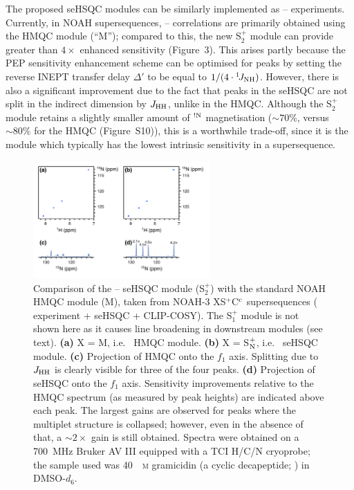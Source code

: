 \documentclass[final,twocolumn]{elsarticle}
\newcommand*{\noahCc}{C$\rm ^c$}
\newcommand*{\noahM}{M}
\newcommand*{\noahSp}{S$^+$}
\newcommand*{\noahSpa}{S$^+_1$}
\newcommand*{\noahSpb}{S$^+_2$}
\newcommand*{\noahSpn}{S$\rm ^+_N$}
\newcommand*{\noahX}{X}
\newcommand*{\carbon}{\ce{^{13}C}}
\newcommand*{\proton}{\ce{^{1}H}}
\newcommand*{\nitrogen}{\ce{^{15}N}}
\newcommand*{\onejnh}{{}^{1}\!J_{\ce{NH}}}
\newcommand*{\jhh}{J_{\ce{HH}}}
\newcommand*{\magnnot}[1]{\ce{^1H}$^{!#1}$}
\begin{document}
The proposed seHSQC modules can be similarly implemented as \proton{}--\nitrogen{} experiments.
Currently, in NOAH supersequences, \proton{}--\nitrogen{} correlations are primarily obtained using the HMQC module (``M'');\cite{Kupce2007MRC, Kupce2017ACIE} compared to this, the new \noahSpb{} module can provide greater than $4\times$ enhanced sensitivity (Figure~3).
This arises partly because the PEP sensitivity enhancement scheme can be optimised for  peaks by setting the reverse INEPT transfer delay $\Delta'$ to be equal to $1/(4 \cdot\onejnh)$.
However, there is also a significant improvement due to the fact that peaks in the \nitrogen{} seHSQC are not split in the indirect dimension by $\jhh$, unlike in the HMQC.
Although the \noahSpb{} module retains a slightly smaller amount of \magnnot{\ce{N}} magnetisation ($\sim 70\%$, versus $\sim 80\%$ for the HMQC (Figure~S10)), this is a worthwhile trade-off, since it is the \nitrogen{} module which typically has the lowest intrinsic sensitivity in a supersequence.

\begin{figure}[!ht]
    \centering
    \includegraphics[width=0.6\textwidth]{FIG3.png}
    \caption{
        Comparison of the \proton{}--\nitrogen{} seHSQC module (\noahSpb{}) with the standard NOAH HMQC module (\noahM{}), taken from NOAH-3 \noahX{}\noahSp{}\noahCc{} supersequences (\nitrogen{} experiment + \carbon{} seHSQC + CLIP-COSY).
        The \noahSpa{} module is not shown here as it causes line broadening in downstream modules (see text).
        \textbf{(a)} X = \noahM{}, i.e.\ \nitrogen{} HMQC module.
        \textbf{(b)} X = \noahSpn{}, i.e.\ \nitrogen{} seHSQC module.
        \textbf{(c)} Projection of HMQC onto the $f_1$ axis.
        Splitting due to $\jhh$ is clearly visible for three of the four peaks.
        \textbf{(d)} Projection of seHSQC onto the $f_1$ axis.
        Sensitivity improvements relative to the HMQC spectrum (as measured by peak heights) are indicated above each peak.
        The largest gains are observed for peaks where the multiplet structure is collapsed; however, even in the absence of that, a $\sim 2\times$ gain is still obtained.
        Spectra were obtained on a \SI{700}{\MHz} Bruker AV III equipped with a TCI H/C/N cryoprobe; the sample used was \SI{40}{\milli\textsc{m}} gramicidin (a cyclic decapeptide; ) in DMSO-$d_6$.
    }
    \label{fig:15n_spv2vsm}
\end{figure}
\end{document}
